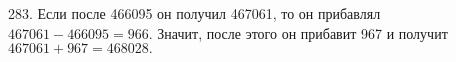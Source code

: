 283. Если после 466095 он получил 467061, то он прибавлял $467061-466095=966.$ Значит, после этого он прибавит 967 и получит $467061+967=468028.$\\
